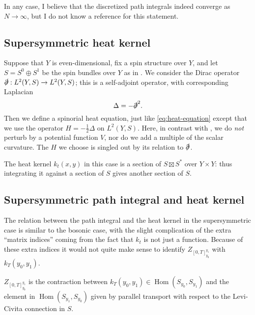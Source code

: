 \documentclass[12pt,letterpaper,reqno]{article}
\numberwithin{equation}{section}
\newcommand{\half}{\ensuremath{\frac{1}{2}}}
\newcommand{\dirac}{\slashed{\partial}}
\newcommand{\ti}[1]{\textit{#1}}
\DeclareMathOperator{\Hom}{Hom}
\newcommand{\fixme}[1]{{\color{orange}{[#1]}}}
\begin{document}
In any case, I believe that
the discretized path integrals indeed converge as $N \to \infty$,
but I do not know a reference for this statement.

\fixme{...}

\subsection{Supersymmetric heat kernel}

Suppose that $Y$ is even-dimensional, fix a spin structure 
over $Y$, and 
let $S = S^0 \oplus S^1$ be the spin bundles over $Y$ as in \fixme{...}.
We consider the Dirac operator $\dirac: L^2(Y, S) \to L^2(Y, S)$;
this is a self-adjoint operator, with corresponding Laplacian
\begin{equation} \label{eq:h-spinorial}
  \Delta = -\dirac^2.
\end{equation}
Then we define a spinorial heat equation,
just like \eqref{eq:heat-equation} except that we use
the operator $H = -\half \Delta$
on $L^2(Y, S)$.
Here, in contrast with \fixme{...}, we do \ti{not} perturb
by a potential function $V$, nor do we add a multiple of the
scalar curvature. The $H$ we choose is singled out
by its relation to $\dirac$.

The heat kernel $k_t(x,y)$ in this case is a section of
$S \boxtimes S^*$ over $Y \times Y$: thus integrating it
against a section of $S$ gives another section of $S$.


\subsection{Supersymmetric path integral and heat kernel}

The relation between the path integral and the heat kernel
in the supersymmetric case is similar to the bosonic case,
with the slight complication of the extra ``matrix indices''
coming from the fact that $k_t$ is not just 
a function. Because of these extra indices it 
would not quite make sense to identify
$Z_{[0,T]_{y_0}^{y_1}}$ with $k_T(y_0, y_1)$.
\fixme{...}



\begin{prop} $Z_{[0,T]_{y_0}^{y_1}}$ is the
contraction between $k_T(y_0,y_1) \in \Hom(S_{y_0}, S_{y_1})$ 
and the element in $\Hom(S_{y_1}, S_{y_0})$ 
given by parallel transport with respect 
to the Levi-Civita connection in $S$. \fixme{oops, this makes no sense}
\end{prop}
\end{document}
